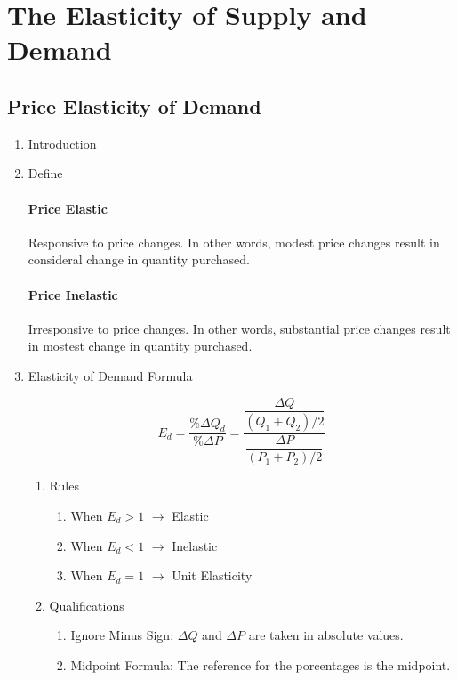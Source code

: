 \newpage
\section{The Elasticity of Supply and Demand}

\subsection{Price Elasticity of Demand}

\begin{enumerate}[label = \textbf{(\Alph*)}, itemsep = 1em]

	\item Introduction
	\item Define

		\paragraph{Price Elastic} Responsive to price changes. In other words, modest price changes result in consideral change in quantity purchased. 
		\paragraph{Price Inelastic} Irresponsive to price changes. In other words, substantial price changes result in mostest change in quantity purchased. 

	\item Elasticity of Demand Formula

		\[ E_d = \dfrac{\%\Delta Q_d}{ \%\Delta P} = \dfrac{\dfrac{\Delta Q}{(Q_1 + Q_2)/2}}{\dfrac{\Delta P}{(P_1 + P_2)/2}} \]

		\begin{enumerate}[label = \textbf{(\arabic*)}, itemsep = 1ex]
			\item Rules
				\begin{enumerate}[label = ---, itemsep = 1ex]
					\item When $E_d > 1$ $\longrightarrow$ Elastic
					\item When $E_d < 1$ $\longrightarrow$ Inelastic	
					\item When $E_d = 1$ $\longrightarrow$ Unit Elasticity
				\end{enumerate}

			\item Qualifications
				\begin{enumerate}[label = \textbf{(\alph*)}, itemsep = 1ex]
					\item Ignore Minus Sign: $\Delta Q$ and $\Delta P$ are taken in absolute values.
					\item Midpoint Formula: The reference for the porcentages is the midpoint.
				\end{enumerate}
		\end{enumerate}


\end{enumerate}
